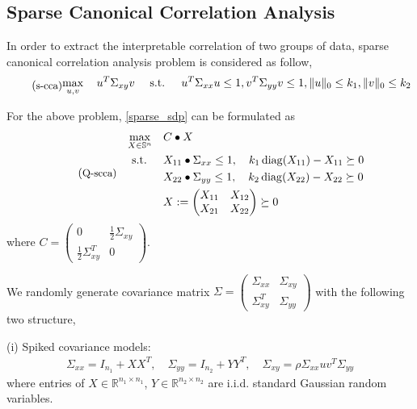 \documentclass[11pt]{amsart}
\theoremstyle{plain}
\theoremstyle{definition}
\theoremstyle{remark}
\newcommand{\RR}{\mathbb{R}}
\DeclareMathOperator{\diag}{diag}
\begin{document}
	\subsection{Sparse Canonical Correlation Analysis}
	In order to extract the interpretable correlation of two groups of data, sparse canonical correlation analysis problem\cite{chu2013sparse,hardoon2011sparse,li2024sparse} is considered as follow,
	\begin{equation}
		\tag{\small{s-cca}}\label{sparse_cca}
		\begin{aligned}
			\max_{u,v} \quad  u^T\Sigma_{xy}v
			\quad\text{ s.t. }\quad u^T\Sigma_{xx}u\leq 1, v^T\Sigma_{yy}v\leq 1,
			\|u\|_0 \leq k_1, \|v\|_0 \leq k_2
		\end{aligned}
	\end{equation}
	
	For the above problem, \eqref{sparse_sdp} can be formulated as
	\begin{equation}\label{sdp_scca}
		\tag{\small{Q-scca}}
		\begin{aligned}
			\max_{X\in \mathbb{S}^n} \quad & C \bullet X\\
			\quad\text{ s.t. }\quad
			&X_{11} \bullet \Sigma_{xx} \leq 1,\quad
			k_1\diag(X_{11}) - X_{11} \succeq 0\\
			&X_{22}\bullet \Sigma_{yy} \leq 1,\quad
			k_2\diag(X_{22}) - X_{22} \succeq 0\\
			&X := \begin{pmatrix}
				X_{11} & X_{12}\\
				X_{21} & X_{22}
			\end{pmatrix}\succeq 0
		\end{aligned}
	\end{equation}
	where $C = \begin{pmatrix}
		0 & \frac{1}{2}\Sigma_{xy}\\
		\frac{1}{2}\Sigma_{xy}^T&0
	\end{pmatrix}.$
	
	We randomly generate covariance matrix $\Sigma = \begin{pmatrix}
		\Sigma_{xx} &\Sigma_{xy}\\
		\Sigma_{xy}^T & \Sigma_{yy}
	\end{pmatrix}$ with the following two structure,
	
	(i) Spiked covariance models:
	\begin{align*}
		\Sigma_{xx} = I_{n_1} + XX^T,\quad
		\Sigma_{yy} = I_{n_2} + YY^T,\quad
		\Sigma_{xy} = \rho \Sigma_{xx}uv^T\Sigma_{yy}
	\end{align*}
	where entries of $X\in\RR^{n_1\times n_1}$, $Y\in\RR^{n_2\times n_2}$ are i.i.d. standard Gaussian random variables.
	
\end{document}
